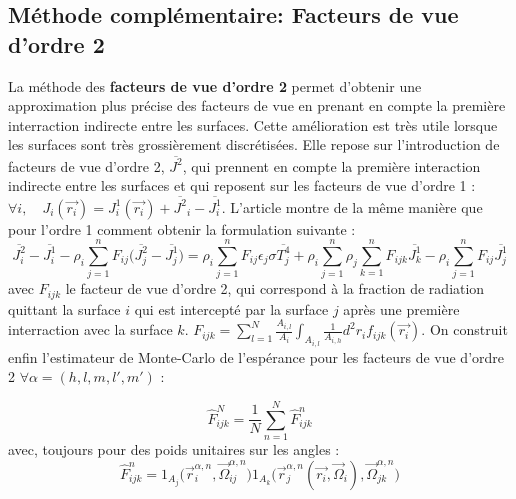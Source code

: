 
\subsection{Méthode complémentaire: Facteurs de vue d'ordre 2}
La méthode des \textbf{facteurs de vue d'ordre 2} permet d'obtenir une approximation plus précise des facteurs de vue en prenant en compte la première interraction indirecte entre les surfaces. Cette amélioration est très utile lorsque les surfaces sont très grossièrement discrétisées. Elle repose sur l'introduction de facteurs de vue d'ordre 2, $\overline{J^2}$, qui prennent en compte la première interaction indirecte entre les surfaces et qui reposent sur les facteurs de vue d'ordre 1 :  $ \forall i, \quad J_i(\vec{r_i}) = J^1_i(\vec{r_i}) + \overline{J^2}_i - \overline{J^1_i} $. L'article \cite{Romain25} montre de la même manière que pour l'ordre 1 comment obtenir la formulation suivante :
\begin{equation}
    \overline{J^2_i} - \overline{J^1_i} - \rho_i \sum_{j=1}^{n} F_{ij}  \bigg(\overline{J^2_j} - \overline{J^1_j}\bigg) = \rho_i \sum_{j=1}^{n}  F_{ij} \epsilon_j \sigma \overline{T^4_j} + \rho_i \sum_{j = 1}^{n} \rho_j \sum_{k=1}^{n} F_{ijk} \overline{J^1_k} - \rho_i \sum_{j=1}^{n} F_{ij} \overline{J^1_j}
\end{equation}
avec $F_{ijk}$ le facteur de vue d'ordre 2, qui correspond à la fraction de radiation quittant la surface $i$ qui est intercepté par la surface $j$ après une première interraction avec la surface $k$. $F_{ijk} = \sum_{l=1}^{N} \frac{A_{i,l}}{A_i} \int_{A_{i,l}} \frac{1}{A_{i,h}} d^2r_i f_{ijk}(\vec{r_i})$. On construit enfin l'estimateur de Monte-Carlo de l'espérance pour les facteurs de vue d'ordre 2 $\forall \alpha = (h,l,m,l',m')$ :

\begin{equation}
    \hat{F}_{ijk}^N = \frac{1}{N} \sum_{n=1}^N \hat{F}^n_{ijk}
\end{equation}
avec, toujours pour des poids unitaires sur les angles :
\begin{equation}
    \hat{F}_{ijk}^n =  1_{A_j}\big(\vec{r}_i^{\alpha,n}, \vec{\Omega}_{ij}^{\alpha,n}\big) 1_{A_k} \big(\vec{r}_j^{\alpha,n}(\vec{r_i}, \vec{\Omega}_i), \vec{\Omega}_{jk}^{\alpha,n} \big)
\end{equation} 

